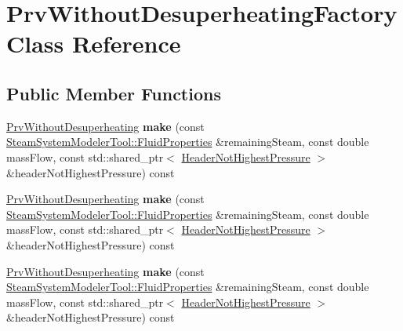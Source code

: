 \hypertarget{class_prv_without_desuperheating_factory}{}\section{Prv\+Without\+Desuperheating\+Factory Class Reference}
\label{class_prv_without_desuperheating_factory}
\subsection*{Public Member Functions}
\begin{DoxyCompactItemize}
\item 
\mbox{\label{class_prv_without_desuperheating_factory_a0640af64c304e94053de55e5cb97649a}} 
\hyperlink{class_prv_without_desuperheating}{Prv\+Without\+Desuperheating} {\bfseries make} (const \hyperlink{struct_steam_system_modeler_tool_1_1_fluid_properties}{Steam\+System\+Modeler\+Tool\+::\+Fluid\+Properties} \&remaining\+Steam, const double mass\+Flow, const std\+::shared\+\_\+ptr$<$ \hyperlink{class_header_not_highest_pressure}{Header\+Not\+Highest\+Pressure} $>$ \&header\+Not\+Highest\+Pressure) const
\item 
\mbox{\label{class_prv_without_desuperheating_factory_a0640af64c304e94053de55e5cb97649a}} 
\hyperlink{class_prv_without_desuperheating}{Prv\+Without\+Desuperheating} {\bfseries make} (const \hyperlink{struct_steam_system_modeler_tool_1_1_fluid_properties}{Steam\+System\+Modeler\+Tool\+::\+Fluid\+Properties} \&remaining\+Steam, const double mass\+Flow, const std\+::shared\+\_\+ptr$<$ \hyperlink{class_header_not_highest_pressure}{Header\+Not\+Highest\+Pressure} $>$ \&header\+Not\+Highest\+Pressure) const
\item 
\mbox{\label{class_prv_without_desuperheating_factory_a0640af64c304e94053de55e5cb97649a}} 
\hyperlink{class_prv_without_desuperheating}{Prv\+Without\+Desuperheating} {\bfseries make} (const \hyperlink{struct_steam_system_modeler_tool_1_1_fluid_properties}{Steam\+System\+Modeler\+Tool\+::\+Fluid\+Properties} \&remaining\+Steam, const double mass\+Flow, const std\+::shared\+\_\+ptr$<$ \hyperlink{class_header_not_highest_pressure}{Header\+Not\+Highest\+Pressure} $>$ \&header\+Not\+Highest\+Pressure) const
\end{DoxyCompactItemize}



